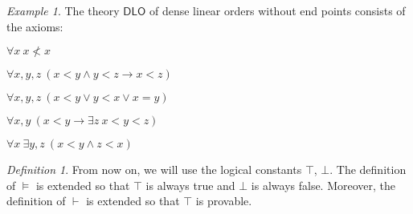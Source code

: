 \documentclass[a4paper, 11pt]{amsart}
\theoremstyle{remark}
\newtheorem{definition}[definition]{Definition}
\newtheorem{example}[example]{Example}
\newenvironment{enumerate-(1)}{\begin{enumerate}[label={\upshape (\arabic*)}, leftmargin=2pc]}{\end{enumerate}}
\begin{document}
\begin{example} 
\label{theory DLO} 
The theory $\mathsf{DLO}$ of dense linear orders without end points consists of the axioms: 
\begin{enumerate-(1)} 
\item 
$\forall x\ x\not< x$ 
\item 
$\forall x,y,z\ (x<y \wedge y<z \rightarrow x<z)$ 
\item 
$\forall x,y,z\ (x<y \vee y<x \vee x=y)$ 
\item 
$\forall x,y\ (x<y \rightarrow \exists z\ x<y<z)$ 
\item 
$\forall x\ \exists y,z\ (x<y \wedge z<x)$ 
\end{enumerate-(1)} 
\end{example} 

\begin{definition} 
From now on, we will use the logical constants $\top$, $\bot$. 
The definition of $\vDash$ is extended so that $\top$ is always true and $\bot$ is always false. 
Moreover, the definition of $\vdash$ is extended so that $\top$ is provable. 
\end{definition} 
\end{document}
